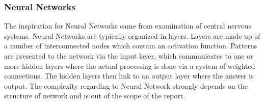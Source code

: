 \subsubsection{Neural Networks}
The inspiration for Neural Networks came from examination of central nervous systems. Neural Networks are typically organized in layers. Layers are made up of a number of interconnected nodes which contain an activation function. Patterns are presented to the network via the input layer, which communicates to one or more hidden layers where the actual processing is done via a system of weighted connections. The hidden layers then link to an output layer where the answer is output. The complexity regarding to Neural Network strongly depends on the structure of network and is out of the scope of the report.~\cite{alg:nn}